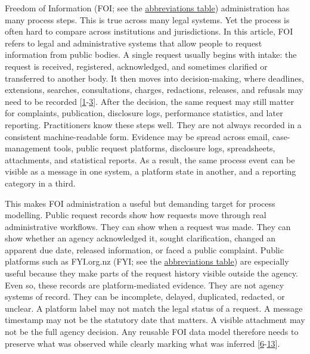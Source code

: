 \documentclass[
]{article}
\begin{document}
Freedom of Information (FOI; see the
\hyperlink{tab-abbreviations}{abbreviations table}) administration has
many process steps. This is true across many legal systems. Yet the
process is often hard to compare across institutions and jurisdictions.
In this article, FOI refers to legal and administrative systems that
allow people to request information from public bodies. A single request
usually begins with intake: the request is received, registered,
acknowledged, and sometimes clarified or transferred to another body. It
then moves into decision-making, where deadlines, extensions, searches,
consultations, charges, redactions, releases, and refusals may need to
be recorded {[}\hyperlink{ref-1}{1}-\hyperlink{ref-3}{3}{]}. After the decision, the same request may still
matter for complaints, publication, disclosure logs, performance
statistics, and later reporting. Practitioners know these steps well.
They are not always recorded in a consistent machine-readable form.
Evidence may be spread across email, case-management tools, public
request platforms, disclosure logs, spreadsheets, attachments, and
statistical reports. As a result, the same process event can be visible
as a message in one system, a platform state in another, and a reporting
category in a third.

This makes FOI administration a useful but demanding target for process
modelling. Public request records show how requests move through real
administrative workflows. They can show when a request was made. They
can show whether an agency acknowledged it, sought clarification,
changed an apparent due date, released information, or faced a public
complaint. Public platforms such as FYI.org.nz (FYI; see the
\hyperlink{tab-abbreviations}{abbreviations table}) are especially
useful because they make parts of the request history visible outside
the agency. Even so, these records are platform-mediated evidence. They
are not agency systems of record. They can be incomplete, delayed,
duplicated, redacted, or unclear. A platform label may not match the
legal status of a request. A message timestamp may not be the statutory
date that matters. A visible attachment may not be the full agency
decision. Any reusable FOI data model therefore needs to preserve what
was observed while clearly marking what was inferred {[}\hyperlink{ref-6}{6}-\hyperlink{ref-13}{13}{]}.
\end{document}
